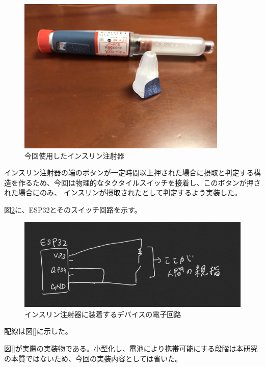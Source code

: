 \begin{figure}[htbp]
  \caption{今回使用したインスリン注射器}
  \label{fig:insulin_pen}
  \begin{center}
    \includegraphics[bb=0 0 1300 1200,width=10cm]{assets/insulin_pen_needle.jpg}
  \end{center}
\end{figure}

インスリン注射器の端のボタンが一定時間以上押された場合に摂取と判定する構造を作るため、今回は物理的なタクタイルスイッチを接着し、このボタンが押された場合にのみ、
インスリンが摂取されたとして判定するよう実装した。

図\ref{fig:insulin_pen_device_circuit}に、ESP32とそのスイッチ回路を示す。

\begin{figure}[htbp]
  \caption{インスリン注射器に装着するデバイスの電子回路}
  \label{fig:insulin_pen_device_circuit}
  \begin{center}
    \includegraphics[bb=0 0 1000 300,width=20cm]{assets/insulin_pen_device_circuit.png}
  \end{center}
\end{figure}

配線は図\ref{}に示した。

図\ref{}が実際の実装物である。小型化し、電池により携帯可能にする段階は本研究の本質ではないため、今回の実装内容としては省いた。

